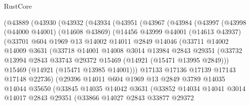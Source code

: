 \begin{lexlean}{RustCore}
\begin{coremodule}
    (@43889
      (@43930
        (@43932
          (@43934
            (@43951
              (@43967
                (@43984
                  (@43997
                    (@43998
                      (@44000 @44001)
                      (@14608 @43869)
                      (@14456
                        @43999
                        @44001
                        (@14613 @43937)
                        (@33701
                          @604
                          @1969
                          @13
                          @14002
                          @14011
                          @2849
                          @14046
                          (@33711
                            @14002
                            @14009
                            @3631
                            (@33718
                              @14001
                              @14008
                              @3014
                              @13984
                              @2843
                              @29351
                              (@33732
                                @13994
                                @2843
                                @33743
                                @29372
                                @15469
                                (@14921 (@15471 @13995 @2849)))
                              @15469
                              (@14921 (@15471 @13985 @14001)))
                            @17133
                            @17136
                            @17139
                            @17143
                            @17148
                            @22736)
                          (@29396
                            @14011
                            @604
                            @1969
                            @13
                            @2849
                            @3789
                            @14035
                            @14044
                            @35650
                            (@33845
                              @14035
                              @14042
                              @3631
                              (@33852
                                @14034
                                @14041
                                @3014
                                @14017
                                @2843
                                @29351
                                (@33866
                                  @14027
                                  @2843
                                  @33877
                                  @29372

\end{coremodule}
\end{lexlean}
